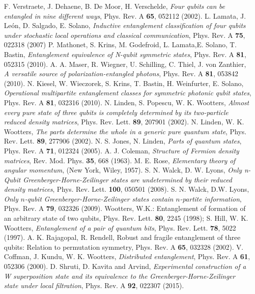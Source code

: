 {\begin{thebibliography}{99}
 F. Verstraete, J.  Dehaene, B. De Moor, H. Verschelde, {\em Four qubits can be entangled in nine different ways}, Phys. Rev. A  {\bf 65}, 052112  (2002).
 L. Lamata, J. Le{\'o}n, D. Salgado, E. Solano, {\em Inductive entanglement classification of four qubits under stochastic local operations and classical communication}, Phys. Rev. A {\bf 75}, 022318 (2007)
 P. Mathonet, S. Krins, M. Godefroid, L. Lamata,E. Solano,  T. Bastin, {\em Entanglement equivalence of N-qubit symmetric states},  Phys. Rev. A {\bf 81}, 052315  (2010).
  A. A. Maser, R. Wiegner, U. Schilling, C. Thiel, J. von Zanthier, {\em A versatile source of polarization-entangled photons},  Phys. Rev. A {\bf 81}, 
053842 (2010).
 N. Kiesel, W. Wieczorek,  S. Krins,  T. Bastin,  H. Weinfurter,  E. Solano, {\em Operational multipartite entanglement classes for symmetric photonic qubit states}, Phys. Rev. A {\bf 81}, 032316 (2010).
  N. Linden, S. Popescu, W. K. Wootters, {\em Almost every pure state of three qubits is completely determined by its two-particle reduced density matrices}, Phys. Rev. Lett.  {\bf 89}, 207901 (2002).
 N. Linden, W. K.  Wootters, {\em The parts determine the whole in a generic pure quantum state}, Phys. Rev. Lett. {\bf 89}, 277906 (2002).
 N. S. Jones, N. Linden, {\em Parts of quantum states}, Phys. Rev. A {\bf 71}, 012324 (2005).
 A. J. Coleman, {\em Structure of Fermion density matrices}, Rev. Mod. Phys. {\bf 35}, 668 (1963). 
 M. E. Rose, {\em Elementary theory of angular momentum}, (New York, Wiley, 1957).  
 S. N. Walck, D. W. Lyons, {\em  Only n-Qubit Greenberger-Horne-Zeilinger states are undetermined
	by their reduced density matrices}, Phys. Rev. Lett. {\bf 100}, 050501 (2008).
 S. N. Walck, D.W. Lyons, {\em  Only $n$-qubit Greenberger-Horne-Zeilinger states contain $n$-partite information}, Phys. Rev. A {\bf 79}, 032326 (2009). 
  Wootters, W.K.: Entanglement of formation of an arbitrary state of two qubits, Phys. Rev. Lett. {\bf 80},  2245 (1998); 
 S. Hill, W. K. Wootters,  {\em Entanglement of a pair of quantum bits}, Phys. Rev. Lett.  {\bf 78},  5022 (1997).
  A. K. Rajagopal, R. Rendell, {\rm  Robust and fragile entanglement of three qubits: Relation to permutation symmetry}, Phys. Rev. A {\bf 65}, 032328 (2002). 
 V. Coffman, J. Kundu, W. K. Wootters, {\em Distributed entanglement}, Phys. Rev. A {\bf  61}, 052306 (2000).  
 D. Shruti, D. Kavita and Arvind, {\em Experimental construction of a W superposition state and its equivalence to the Greenberger-Horne-Zeilinger state under local filtration}, Phys. Rev. A {\bf 92}, 022307 (2015).  
\end{thebibliography}
\renewcommand{\thesection}{\arabic{section}}


}
